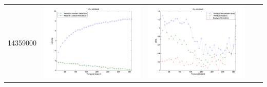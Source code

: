\documentclass[11pt]{article}
\begin{document}
\begin{table}[H]
{\begin{tabular}{c  c   c   c c }
14359000&\begin{minipage}{.4\textwidth}\includegraphics[width=\linewidth]{resultgraph/14359000e.png}\end{minipage}
&\begin{minipage}{.4\textwidth}\includegraphics[width=\linewidth]{resultgraph/14359000MI.png}\end{minipage}

\end{tabular}}
\end{table}
\end{document}
